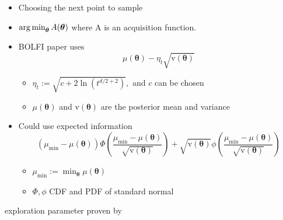 \begin{itemize}
    \item Choosing the next point to sample
    \item $\operatorname*{arg\,min}_{\bm{\theta}}A(\bm\theta)$ where A is an acquisition function.
    \item BOLFI paper uses $$\mu(\bm\theta) - \eta_t\sqrt{\mathrm{v}(\bm\theta)}$$ \begin{itemize}
              \item $\eta_t:= \sqrt{c + 2\ln(t^{d/2 + 2})},$ and $c$ can be chosen
              \item $\mu(\bm\theta)$ and $\mathrm{v}(\bm\theta)$ are the posterior mean and variance
          \end{itemize}

    \item Could use expected information
          $$
              (\mu_\text{min} - \mu(\bm\theta)) \varPhi \left(
              \frac{\mu_\text{min} - \mu(\bm\theta)}{\sqrt{\mathrm{v}(\bm\theta)}}
              \right)
              + \sqrt{\mathrm{v}(\bm\theta)}\phi\left(
              \frac{\mu_\text{min} - \mu(\bm\theta)}{\sqrt{\mathrm{v}(\bm\theta)}}
              \right)
          $$
          \begin{itemize}
              \item $\mu_\text{min} := \min_{\bm{\theta}} \mu(\bm\theta)$
              \item $\varPhi, \phi$ CDF and PDF of standard normal
          \end{itemize}
\end{itemize}

exploration parameter proven by \cite{srinivas_gaussian_2010}